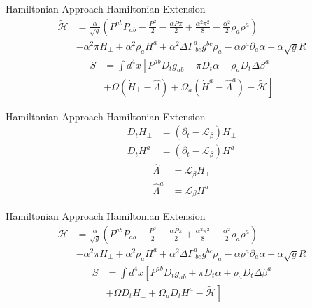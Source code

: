 \documentclass[xcolor=dvipsnames]{beamer}
\begin{document}
	\begin{frame}{Hamiltonian Approach}
		Hamiltonian Extension
		\begin{align*}
				\tilde{\mathscr{H}} & = \frac{\alpha}{\sqrt{g}}\left(P^{ab}P_{ab} - \frac{P^{2}}{2} - \frac{\alpha P \pi}{2} + \frac{\alpha^{2}\pi^{2}}{8} - \frac{\alpha^{2}}{2}\rho_{a}\rho^{a}\right)\\
				& -\alpha^{2}\pi H_{\perp} + \alpha^{2}\rho_{a}H^{a} + \alpha^{2}\Delta\Gamma^{a}_{~bc}g^{bc}\rho_{a} - \alpha \rho^{a}\partial_{a}\alpha - \alpha\sqrt{g}R
		\end{align*}
		\begin{align*}
			S &= \int d^{4}x \left[ P^{ab}D_{t}g_{ab} + \pi D_{t}\alpha + \rho_{a}D_{t}\Delta\beta^{a}\right. \\
			& \left. + \Omega \left({\dot H}_{\perp} - {\hat \Lambda}\right) + \Omega_{a}\left({\dot H}^{a} - {\hat \Lambda}^{a}\right) - \tilde{\mathscr{H}}\right]
		\end{align*}	
	\end{frame}
	\begin{frame}{Hamiltonian Approach}
		Hamiltonian Extension
		\begin{align*}
			D_{t}H_{\perp} &= \left(\partial_{t} - \mathcal{L}_{\beta}\right)H_{\perp}\\
			D_{t}H^{a} &= \left(\partial_{t} - \mathcal{L}_{\beta}\right)H^{a}
		\end{align*}
		\pause
		\begin{align*}
			{\hat \Lambda} &= \mathcal{L}_{\beta}H_{\perp}\\
			{\hat \Lambda}^{a} &= \mathcal{L}_{\beta}H^{a}
		\end{align*}
	\end{frame}
	\begin{frame}{Hamiltonian Approach}
		Hamiltonian Extension
		\begin{align*}
				\tilde{\mathscr{H}} & = \frac{\alpha}{\sqrt{g}}\left(P^{ab}P_{ab} - \frac{P^{2}}{2} - \frac{\alpha P \pi}{2} + \frac{\alpha^{2}\pi^{2}}{8} - \frac{\alpha^{2}}{2}\rho_{a}\rho^{a}\right)\\
				& -\alpha^{2}\pi H_{\perp} + \alpha^{2}\rho_{a}H^{a} + \alpha^{2}\Delta\Gamma^{a}_{~bc}g^{bc}\rho_{a} - \alpha \rho^{a}\partial_{a}\alpha - \alpha\sqrt{g}R
		\end{align*}
		\begin{align*}
			S &= \int d^{4}x \left[ P^{ab}D_{t}g_{ab} + \pi D_{t}\alpha + \rho_{a}D_{t}\Delta\beta^{a}\right. \\
			& \left. + \Omega D_{t}H_{\perp} + \Omega_{a}D_{t}H^{a} - \tilde{\mathscr{H}}\right]
		\end{align*}	
	\end{frame}
\end{document}
